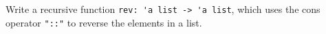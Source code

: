 Write a recursive function \mbox{\lstinline{rev: 'a list -> 'a list}}, which uses the cons operator \lstinline{"::"} to reverse the elements in a list.
